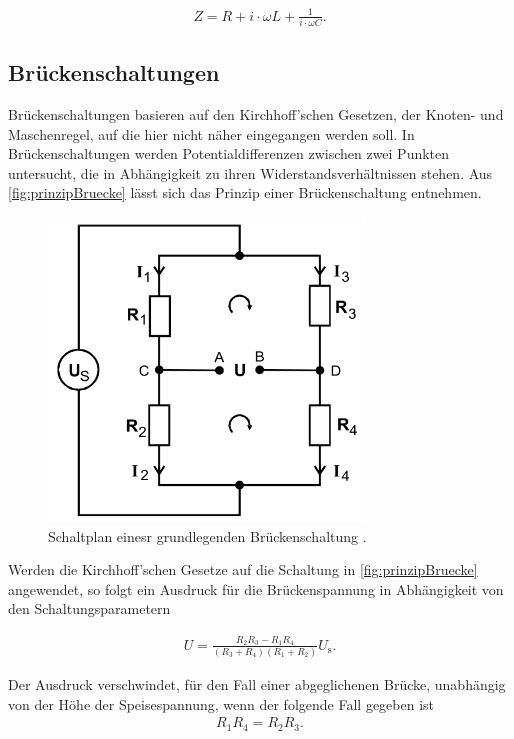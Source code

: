 \begin{align}
    \label{eqn:impedanz}
    Z = R + i\cdot\omega L + \frac{1}{i\cdot\omega C}.
\end{align}


\subsection{Brückenschaltungen}
Brückenschaltungen basieren auf den Kirchhoff'schen Gesetzen, der Knoten- und Maschenregel, auf die hier nicht näher eingegangen werden soll.
In Brückenschaltungen werden Potentialdifferenzen zwischen zwei Punkten untersucht, die in Abhängigkeit zu ihren Widerstandsverhältnissen
stehen. Aus \autoref{fig:prinzipBruecke} lässt sich das Prinzip einer Brückenschaltung entnehmen.

\begin{figure}[H]
    \centering
    \includegraphics[width=0.75\textwidth]{dateien/PrinzipBrueckenschaltung.png}
    \caption{Schaltplan einesr grundlegenden Brückenschaltung \cite{anleitung}.}
    \label{fig:prinzipBruecke}
\end{figure}

Werden die Kirchhoff'schen Gesetze auf die Schaltung in \autoref{fig:prinzipBruecke} angewendet, so folgt ein Ausdruck
für die Brückenspannung in Abhängigkeit von den Schaltungsparametern

\begin{align*}
    U = \frac{R_2R_3 - R_1R_4}{(R_3+R_4)(R_1+R_2)} U_{\text{s}}  .
\end{align*}

Der Ausdruck verschwindet, für den Fall einer abgeglichenen Brücke, unabhängig von der Höhe der Speisespannung, 
wenn der folgende Fall gegeben ist
\begin{align}
    \label{eqn:abgBr}
    R_1R_4=R_2R_3.
\end{align}


